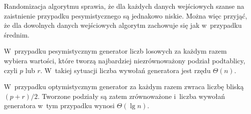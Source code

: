 
\exercise %
Randomizacja algorytmu sprawia, że dla każdych danych wejściowych szanse na zaistnienie przypadku pesymistycznego są jednakowo niskie.
Można więc przyjąć, że dla dowolnych danych wejściowych algorytm zachowuje się jak w~przypadku średnim.

\exercise %
W~przypadku pesymistycznym generator liczb losowych za każdym razem wybiera wartości, które tworzą najbardziej niezrównoważony podział podtablicy, czyli $p$ lub $r$.
W~takiej sytuacji liczba wywołań generatora jest rzędu $\Theta(n)$.

W~przypadku optymistycznym generator za każdym razem zwraca liczbę bliską $(p+r)/2$.
Tworzone podziały są zatem zrównoważone i~liczba wywołań generatora w~tym przypadku wynosi $\Theta(\lg n)$.
